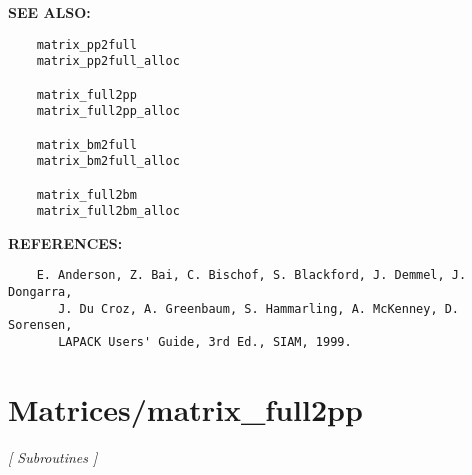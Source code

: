 \textbf{SEE ALSO:}\hspace{0.08in}\begin{Verbatim}
    matrix_pp2full
    matrix_pp2full_alloc

    matrix_full2pp
    matrix_full2pp_alloc

    matrix_bm2full
    matrix_bm2full_alloc

    matrix_full2bm
    matrix_full2bm_alloc
\end{Verbatim}
\textbf{REFERENCES:}\hspace{0.08in}\begin{Verbatim}
    E. Anderson, Z. Bai, C. Bischof, S. Blackford, J. Demmel, J. Dongarra,
       J. Du Croz, A. Greenbaum, S. Hammarling, A. McKenney, D. Sorensen,
       LAPACK Users' Guide, 3rd Ed., SIAM, 1999.
\end{Verbatim}
\section{Matrices/matrix\_full2pp}
\textsl{[ Subroutines ]}

